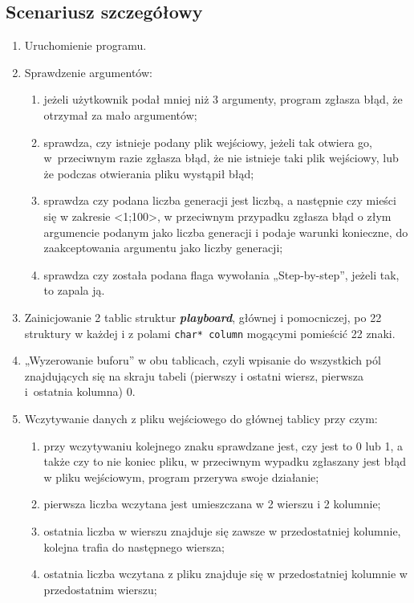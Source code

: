 \documentclass[12pt]{report}
\newcommand{\code}[1]{\texttt{#1}}
\begin{document}
\subsection{Scenariusz szczegółowy}
\begin{enumerate}
\item Uruchomienie programu.
\item Sprawdzenie argumentów:
\begin{enumerate}
    \item jeżeli użytkownik podał mniej niż 3 argumenty, program zgłasza błąd, że otrzymał za mało argumentów;
    \item sprawdza, czy istnieje podany plik wejściowy, jeżeli tak otwiera go, w~przeciwnym razie zgłasza błąd, że nie istnieje taki plik wejściowy, lub że podczas otwierania pliku wystąpił błąd;
    \item sprawdza czy podana liczba generacji jest liczbą, a następnie czy mieści się w zakresie <1;100>, w przeciwnym przypadku zgłasza błąd o złym argumencie podanym jako liczba generacji i podaje warunki konieczne, do zaakceptowania argumentu jako liczby generacji;
    \item sprawdza czy została podana flaga wywołania „Step-by-step”, jeżeli tak, to zapala ją.
    \end{enumerate}
\item Zainicjowanie 2 tablic struktur \textbf{\textit{playboard}}, głównej i pomocniczej, po 22 struktury w każdej i z polami \code{char* column} mogącymi pomieścić 22 znaki.
\item „Wyzerowanie buforu” w obu tablicach, czyli wpisanie do wszystkich pól znajdujących się na skraju tabeli (pierwszy i ostatni wiersz, pierwsza i~ostatnia kolumna) 0.
\item Wczytywanie danych z pliku wejściowego do głównej tablicy przy czym:
\begin{enumerate}
    \item przy wczytywaniu kolejnego znaku sprawdzane jest, czy jest to 0 lub 1, a także czy to nie koniec pliku, w przeciwnym wypadku zgłaszany jest błąd w pliku wejściowym, program przerywa swoje działanie;
    \item pierwsza liczba wczytana jest umieszczana w 2 wierszu i 2 kolumnie;
    \item ostatnia liczba w wierszu znajduje się zawsze w przedostatniej kolumnie, kolejna trafia do następnego wiersza;
    \item ostatnia liczba wczytana z pliku znajduje się w przedostatniej kolumnie w przedostatnim wierszu;

\end{enumerate}
\end{enumerate}
\end{document}
